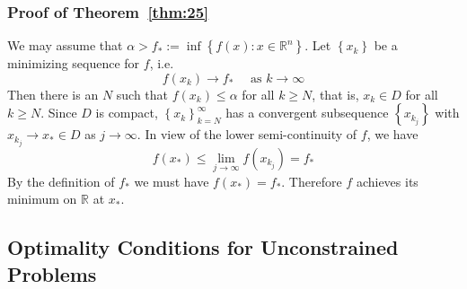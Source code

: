 \subsubsection{Proof of Theorem~\ref{thm:25}}
\label{appendix:thm25}
We may assume that $\alpha>f_{*}:=\inf \left\{f(x): x \in \mathbb{R}^{n}\right\}$. Let $\left\{x_{k}\right\}$ be a minimizing sequence for $f$, i.e.
$$
f\left(x_{k}\right) \rightarrow f_{*} \quad \textrm { as }  k \rightarrow \infty
$$
Then there is an $N$ such that $f(x_k) \leq \alpha$ for all $k \geq N$, that is, $x_k \in D$ for all $k \geq N$. Since $D$ is compact, $\left\{x_{k}\right\}_{k=N}^{\infty}$ has a convergent subsequence $\left\{x_{k_j}\right\}$ with $x_{k_{j}} \rightarrow x_{*} \in D$ as $j \rightarrow \infty$. In view of the lower semi-continuity of $f$, we have
$$
f\left(x_{*}\right) \leq \lim _{j \rightarrow \infty} f\left(x_{k_{j}}\right)=f_{*}
$$
By the definition of $f_*$ we must have $f(x_{*}) = f_*$. Therefore $f$ achieves its minimum on $\mathbb{R}$ at $x_{*}$.  

\subsection{Optimality Conditions for Unconstrained Problems}

